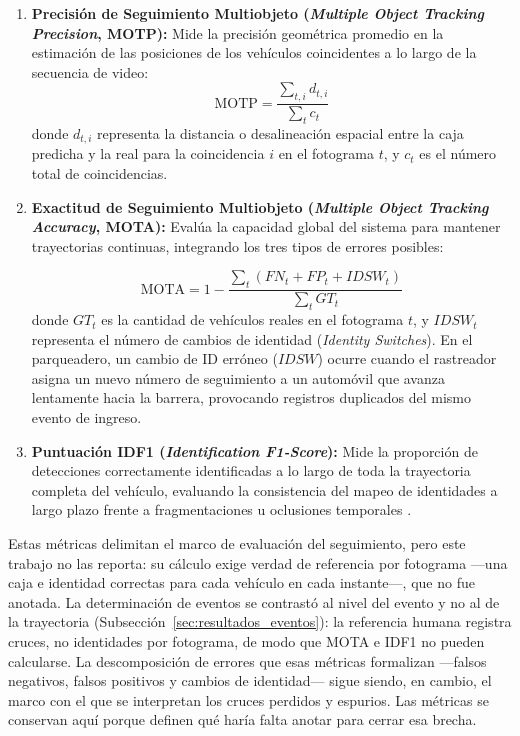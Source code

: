 \begin{enumerate}
    \item \textbf{Precisión de Seguimiento Multiobjeto (\textit{Multiple Object
        Tracking Precision}, MOTP):} Mide la precisión geométrica promedio en la
        estimación de las posiciones de los vehículos coincidentes a lo largo de
        la secuencia de video:
        \begin{equation}
            \text{MOTP} = \frac{\sum_{t, i} d_{t, i}}{\sum_t c_t}
        \end{equation}
        donde $d_{t, i}$ representa la distancia o desalineación espacial entre
        la caja predicha y la real para la coincidencia $i$ en el fotograma $t$,
        y $c_t$ es el número total de coincidencias.

    \item \textbf{Exactitud de Seguimiento Multiobjeto (\textit{Multiple Object
        Tracking Accuracy}, MOTA):} Evalúa la capacidad global del sistema para
        mantener trayectorias continuas, integrando los tres tipos de errores
        posibles:

        \begin{equation}
            \text{MOTA} = 1 - \frac{\sum_t (FN_t + FP_t + IDSW_t)}{\sum_t GT_t}
        \end{equation}
        donde $GT_t$ es la cantidad de vehículos reales en el fotograma $t$, y
        $IDSW_t$ representa el número de cambios de identidad (\textit{Identity
        Switches}). En el parqueadero, un cambio de ID erróneo ($IDSW$) ocurre
        cuando el rastreador asigna un nuevo número de seguimiento a un automóvil
        que avanza lentamente hacia la barrera, provocando registros duplicados
        del mismo evento de ingreso.

    \item \textbf{Puntuación IDF1 (\textit{Identification F1-Score}):} Mide la
        proporción de detecciones correctamente identificadas a lo largo de toda
        la trayectoria completa del vehículo, evaluando la consistencia del mapeo
        de identidades a largo plazo frente a fragmentaciones u oclusiones
        temporales \cite{ristani2016performance}.
\end{enumerate}

Estas métricas delimitan el marco de evaluación del seguimiento, pero este
trabajo no las reporta: su cálculo exige verdad de referencia por fotograma ---una
caja e identidad correctas para cada vehículo en cada instante---, que no fue
anotada. La determinación de eventos se contrastó al nivel del evento y no al de la
trayectoria (Subsección~\ref{sec:resultados_eventos}): la referencia humana
registra cruces, no identidades por fotograma, de modo que MOTA e IDF1 no pueden
calcularse. La descomposición de errores que esas métricas formalizan ---falsos
negativos, falsos positivos y cambios de identidad--- sigue siendo, en cambio, el
marco con el que se interpretan los cruces perdidos y espurios. Las métricas se
conservan aquí porque definen qué haría falta anotar para cerrar esa brecha.

